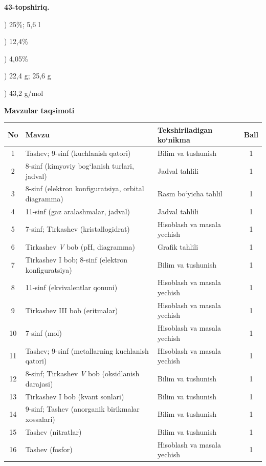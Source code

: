 \documentclass[11pt,a4paper]{article}
\begin{document}
\noindent\textbf{43-topshiriq.}\par
{}) 25\%; 5,6 l\par
{}) 12,4\%\par
{}) 4,05\%\par
{}) 22,4 g; 25,6 g\par
{}) 43,2 g/mol\par
\par\bigskip\noindent\textbf{Mavzular taqsimoti}\par\smallskip
{\small\noindent\begin{longtable}{|c|p{7.2cm}|p{5.4cm}|c|}\hline \textbf{No} & \textbf{Mavzu} & \textbf{Tekshiriladigan ko`nikma} & \textbf{Ball}\\\hline
1 & Tashev; 9-sinf (kuchlanish qatori) & Bilim va tushunish & 1\\\hline
2 & 8-sinf (kimyoviy bog`lanish turlari, jadval) & Jadval tahlili & 1\\\hline
3 & 8-sinf (elektron konfiguratsiya, orbital diagramma) & Rasm bo`yicha tahlil & 1\\\hline
4 & 11-sinf (gaz aralashmalar, jadval) & Jadval tahlili & 1\\\hline
5 & 7-sinf; Tirkashev (kristallogidrat) & Hisoblash va masala yechish & 1\\\hline
6 & Tirkashev \textit{V} bob (pH, diagramma) & Grafik tahlili & 1\\\hline
7 & Tirkashev I bob; 8-sinf (elektron konfiguratsiya) & Bilim va tushunish & 1\\\hline
8 & 11-sinf (ekvivalentlar qonuni) & Hisoblash va masala yechish & 1\\\hline
9 & Tirkashev III bob (eritmalar) & Hisoblash va masala yechish & 1\\\hline
10 & 7-sinf (mol) & Hisoblash va masala yechish & 1\\\hline
11 & Tashev; 9-sinf (metallarning kuchlanish qatori) & Hisoblash va masala yechish & 1\\\hline
12 & 8-sinf; Tirkashev \textit{V} bob (oksidlanish darajasi) & Bilim va tushunish & 1\\\hline
13 & Tirkashev I bob (kvant sonlari) & Bilim va tushunish & 1\\\hline
14 & 9-sinf; Tashev (anorganik birikmalar xossalari) & Bilim va tushunish & 1\\\hline
15 & Tashev (nitratlar) & Bilim va tushunish & 1\\\hline
16 & Tashev (fosfor) & Hisoblash va masala yechish & 1\\\hline

\end{longtable}}
\end{document}
